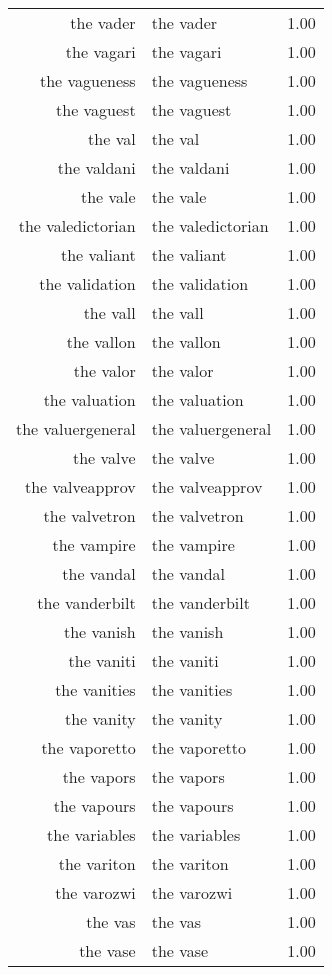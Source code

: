 \begin{table}[ht]
\begin{tabular}{rlr}
  the vader & the vader & 1.00 \\ 
  the vagari & the vagari & 1.00 \\ 
  the vagueness & the vagueness & 1.00 \\ 
  the vaguest & the vaguest & 1.00 \\ 
  the val & the val & 1.00 \\ 
  the valdani & the valdani & 1.00 \\ 
  the vale & the vale & 1.00 \\ 
  the valedictorian & the valedictorian & 1.00 \\ 
  the valiant & the valiant & 1.00 \\ 
  the validation & the validation & 1.00 \\ 
  the vall & the vall & 1.00 \\ 
  the vallon & the vallon & 1.00 \\ 
  the valor & the valor & 1.00 \\ 
  the valuation & the valuation & 1.00 \\ 
  the valuergeneral & the valuergeneral & 1.00 \\ 
  the valve & the valve & 1.00 \\ 
  the valveapprov & the valveapprov & 1.00 \\ 
  the valvetron & the valvetron & 1.00 \\ 
  the vampire & the vampire & 1.00 \\ 
  the vandal & the vandal & 1.00 \\ 
  the vanderbilt & the vanderbilt & 1.00 \\ 
  the vanish & the vanish & 1.00 \\ 
  the vaniti & the vaniti & 1.00 \\ 
  the vanities & the vanities & 1.00 \\ 
  the vanity & the vanity & 1.00 \\ 
  the vaporetto & the vaporetto & 1.00 \\ 
  the vapors & the vapors & 1.00 \\ 
  the vapours & the vapours & 1.00 \\ 
  the variables & the variables & 1.00 \\ 
  the variton & the variton & 1.00 \\ 
  the varozwi & the varozwi & 1.00 \\ 
  the vas & the vas & 1.00 \\ 
  the vase & the vase & 1.00 \\ 

\end{tabular}
\end{table}
